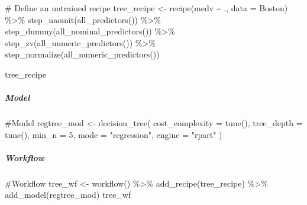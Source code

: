 \documentclass[
]{article}
\let\oldsubparagraph\subparagraph
\renewcommand{\subparagraph}[1]{\oldsubparagraph{#1}\mbox{}}
\newenvironment{Shaded}{\begin{snugshade}}{\end{snugshade}}
\newcommand{\AttributeTok}[1]{\textcolor[rgb]{0.40,0.45,0.13}{#1}}
\newcommand{\CommentTok}[1]{\textcolor[rgb]{0.37,0.37,0.37}{#1}}
\newcommand{\DecValTok}[1]{\textcolor[rgb]{0.68,0.00,0.00}{#1}}
\newcommand{\FunctionTok}[1]{\textcolor[rgb]{0.28,0.35,0.67}{#1}}
\newcommand{\NormalTok}[1]{\textcolor[rgb]{0.00,0.23,0.31}{#1}}
\newcommand{\OtherTok}[1]{\textcolor[rgb]{0.00,0.23,0.31}{#1}}
\newcommand{\SpecialCharTok}[1]{\textcolor[rgb]{0.37,0.37,0.37}{#1}}
\newcommand{\StringTok}[1]{\textcolor[rgb]{0.13,0.47,0.30}{#1}}
\begin{document}
\begin{Shaded}
\begin{Highlighting}[]
\CommentTok{\# Define an untrained recipe }
\NormalTok{tree\_recipe }\OtherTok{\textless{}{-}} \FunctionTok{recipe}\NormalTok{(medv }\SpecialCharTok{\textasciitilde{}}\NormalTok{ ., }\AttributeTok{data =}\NormalTok{ Boston) }\SpecialCharTok{\%\textgreater{}\%}
  \FunctionTok{step\_naomit}\NormalTok{(}\FunctionTok{all\_predictors}\NormalTok{()) }\SpecialCharTok{\%\textgreater{}\%}       
  \FunctionTok{step\_dummy}\NormalTok{(}\FunctionTok{all\_nominal\_predictors}\NormalTok{()) }\SpecialCharTok{\%\textgreater{}\%} 
  \FunctionTok{step\_zv}\NormalTok{(}\FunctionTok{all\_numeric\_predictors}\NormalTok{()) }\SpecialCharTok{\%\textgreater{}\%}    
  \FunctionTok{step\_normalize}\NormalTok{(}\FunctionTok{all\_numeric\_predictors}\NormalTok{())}

\NormalTok{tree\_recipe}
\end{Highlighting}
\end{Shaded}

\hypertarget{model}{%
\subparagraph{Model}\label{model}}

\begin{Shaded}
\begin{Highlighting}[]
\CommentTok{\#Model}
\NormalTok{regtree\_mod }\OtherTok{\textless{}{-}} \FunctionTok{decision\_tree}\NormalTok{(}
  \AttributeTok{cost\_complexity =} \FunctionTok{tune}\NormalTok{(),}
  \AttributeTok{tree\_depth =} \FunctionTok{tune}\NormalTok{(),}
  \AttributeTok{min\_n =} \DecValTok{5}\NormalTok{,}
  \AttributeTok{mode =} \StringTok{"regression"}\NormalTok{,}
  \AttributeTok{engine =} \StringTok{"rpart"}
\NormalTok{  ) }
\end{Highlighting}
\end{Shaded}

\hypertarget{workflow}{%
\subparagraph{Workflow}\label{workflow}}

\begin{Shaded}
\begin{Highlighting}[]
\CommentTok{\#Workflow}
\NormalTok{tree\_wf }\OtherTok{\textless{}{-}} \FunctionTok{workflow}\NormalTok{() }\SpecialCharTok{\%\textgreater{}\%}
  \FunctionTok{add\_recipe}\NormalTok{(tree\_recipe) }\SpecialCharTok{\%\textgreater{}\%}
  \FunctionTok{add\_model}\NormalTok{(regtree\_mod)}
\NormalTok{tree\_wf}
\end{Highlighting}
\end{Shaded}
\end{document}
